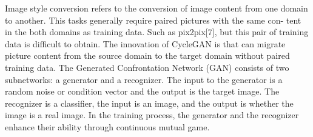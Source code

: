 


\begin{abstract2}[english]
    Image style conversion refers to the conversion of image content from one domain to another.
    This tasks generally require paired pictures with the same con- tent in the both domains as training data. 
    Such as pix2pix[7], but this pair of training data is difficult to obtain. 
    The innovation of CycleGAN is that can migrate picture content from the source domain 
    to the target domain without paired training data. 
    The Generated Confrontation Network (GAN) consists of two subnetworks: a generator and a recognizer.
    The input to the generator is a random noise or condition vector 
    and the output is the target image. 
    The recognizer is a classifier, the input is an image, 
    and the output is whether the image is a real image. 
    In the training process, the generator and 
    the recognizer enhance their ability through continuous mutual game.

\end{abstract2}
